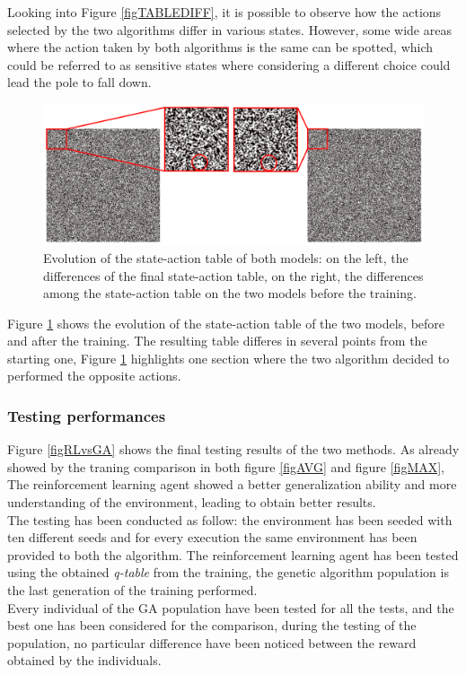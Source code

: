 Looking into Figure \ref{figTABLEDIFF}, it is possible to observe how the actions selected by the two algorithms differ in various states. However, some wide areas where the action taken by both algorithms is the same can be spotted, which could be referred to as sensitive states where considering a different choice could lead the pole to fall down.\\

\begin{figure}[H]
	\centering
	\includegraphics [width=\linewidth]{Images/diff_comparison.png}
	\caption{Evolution of the state-action table of both models: on the left, the differences of the final state-action table, on the right, the differences among the state-action table on the two models before the training.}
	\label{figDIFF_COMPARISON}
\end{figure}


Figure \ref{figDIFF_COMPARISON} shows the evolution of the state-action table of the two models, before and after the training. The resulting table differes in several points from the starting one, Figure \ref{figDIFF_COMPARISON} highlights one section where the two algorithm decided to performed the opposite actions. 

\subsubsection{Testing performances}

Figure \ref{figRLvsGA} shows the final testing results of the two methods. As already showed by the traning comparison in both figure \ref{figAVG} and figure \ref{figMAX}, The reinforcement learning agent showed a better generalization ability and more understanding of the environment, leading to obtain better results.\\
The testing has been conducted as follow: the environment has been seeded with ten different seeds and for every execution the same environment has been provided to both the algorithm.
The reinforcement learning agent has been tested using the obtained \textit{q-table} from the training, the genetic algorithm population is the last generation of the training performed.\\
Every individual of the GA population have been tested for all the tests, and the best one has been considered for the comparison, during the testing of the population, no particular difference have been noticed between the reward obtained by the individuals.

